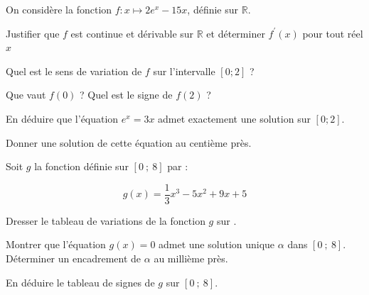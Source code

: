 \documentclass[11pt,a4paper]{article}  %
\begin{document}

On considère la fonction $f: x \mapsto 2e^x-15 x$, définie sur $\mathbb{R}$.
\begin{enumMet}
	\item Justifier que $f$ est continue et dérivable sur $\mathbb{R}$ et déterminer $f^{\prime}(x)$ pour tout réel $x$
	\item Quel est le sens de variation de $f$ sur l'intervalle $[0 ; 2]$ ?
	\item Que vaut $f(0)$ ? Quel est le signe de $f(2)$ ?
	\item En déduire que l'équation $e^x=3 x$ admet exactement une solution sur $[0 ; 2]$.
	\item Donner une solution de cette équation au centième près.
\end{enumMet}



Soit $g$ la fonction définie sur $[0\ ;\ 8]$ par :

$$
g(x)=\frac{1}{3} x^3-5x^2+9x+5
$$

\begin{enumMet}
	\item Dresser le tableau de variations de la fonction $g$ sur \R.
	\item Montrer que l'équation $g(x)=0$ admet une solution unique $\alpha$ dans $[0\ ;\ 8]$. Déterminer un encadrement de $\alpha$ au millième près.
	\item En déduire le tableau de signes de $g$ sur $[0\ ;\ 8]$.
\end{enumMet}
\end{document}
